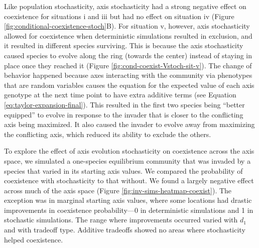 Like population stochasticity, axis stochasticity had a strong negative 
effect on coexistence for situations i and iii but had no effect on
situation iv (Figure \ref{fig:conditional-coexistence-stoch}B).
For situation v, however, axis stochasticity allowed for coexistence
when deterministic simulations resulted in exclusion, 
and it resulted in different species surviving.
This is because the axis stochasticity caused species to evolve 
along the ring (towards the center) instead of staying in place once they 
reached it (Figure \ref{fig:cond-coexist-Vstoch-sit-v}).
The change of behavior happened because axes interacting with the 
community via phenotypes that are
random variables causes the equation for the expected value of each axis genotype at 
the next time point to have extra additive terms
(see Equation \ref{eq:taylor-expansion-final}).
This resulted in the first two species being ``better equipped'' to evolve in 
response to the invader that is closer to the conflicting axis being
maximized.
It also caused the invader to evolve away from maximizing the conflicting
axis, which reduced its ability to exclude the others.






To explore the effect of axis evolution stochasticity on coexistence across 
the axis space,
we simulated a one-species equilibrium community that was invaded by 
a species that varied in its starting axis values.
We compared the probability of coexistence with stochasticity to that without.
We found a largely negative effect across much of the axis space
(Figure \ref{fig:inv-sims-heatmap-coexist}).
The exception was in marginal starting axis values, where some locations
had drastic improvements in coexistence probability---0 in deterministic 
simulations and 1 in stochastic simulations.
The range where improvements occurred varied with $d_1$ and with tradeoff type.
Additive tradeoffs showed no areas where stochasticity helped coexistence.

